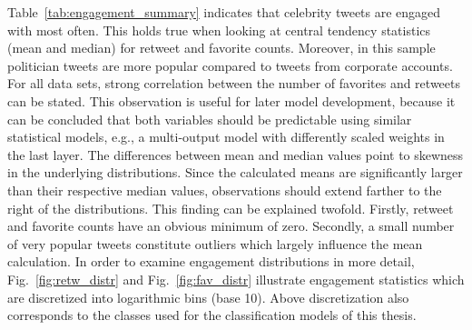 Table~\ref{tab:engagement_summary} indicates that celebrity tweets are engaged
with most often.
This holds true when looking at central tendency statistics (mean and median)
for retweet and favorite counts.
Moreover, in this sample politician tweets are more popular compared to tweets from corporate
accounts.
For all data sets, strong correlation between the number of favorites and retweets can
be stated.
This observation is useful for later model development, because it can be concluded that
both variables should be predictable using similar statistical models, e.g.,
a multi-output model with differently scaled weights in the last layer.
The differences between mean and median values point to skewness in the
underlying distributions.
Since the calculated means are significantly larger than their respective
median values, observations should extend farther to the right
of the distributions.
This finding can be explained twofold. 
Firstly, retweet and favorite counts have an obvious  minimum of zero.
Secondly, a small number of very popular tweets constitute outliers which largely
influence the mean calculation.
In order to examine engagement distributions in more detail, Fig.~\ref{fig:retw_distr} and
Fig.~\ref{fig:fav_distr} illustrate engagement statistics which are discretized into logarithmic bins (base 10).
Above discretization also corresponds to the classes used for the classification models
of this thesis.

